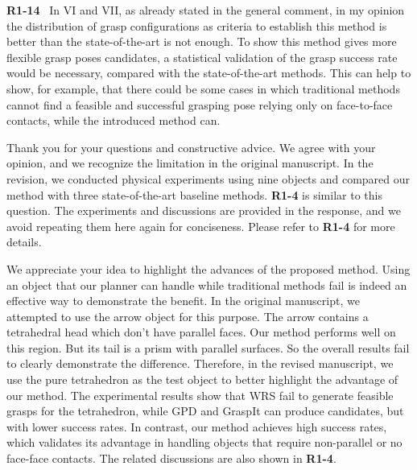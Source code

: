 \documentclass[journal]{IEEEtran}
\begin{document}

\noindent
{\textbf{\color{black}R1-14}\color{gray}~
In VI and VII, as already stated in the general comment, in my opinion the distribution of grasp configurations as criteria to establish this method is better than the state-of-the-art is not enough. To show this method gives more flexible grasp poses candidates, a statistical validation of the grasp success rate would be necessary, compared with the state-of-the-art methods. This can help to show, for example, that there could be some cases in which traditional methods cannot find a feasible and successful grasping pose relying only on face-to-face contacts, while the introduced method can.
}

Thank you for your questions and constructive advice. We agree with your opinion, and we recognize the limitation in the original manuscript. In the revision, we conducted physical experiments using nine objects and compared our method with three state-of-the-art baseline methods. \textbf{R1-4} is similar to this question. The experiments and discussions are provided in the response, and we avoid repeating them here again for conciseness. Please refer to \textbf{R1-4} for more details.

We appreciate your idea to highlight the advances of the proposed method. 
Using an object that our planner can handle while traditional methods fail is indeed an effective way to demonstrate the benefit. In the original manuscript, we attempted to use the arrow object for this purpose. The arrow contains a tetrahedral head which don't have parallel faces. Our method performs well on this region. But its tail is a prism with parallel surfaces. So the overall results fail to clearly demonstrate the difference. Therefore, in the revised manuscript, we use the pure tetrahedron as the test object to better highlight the advantage of our method. The experimental results show that WRS fail to generate feasible grasps for the tetrahedron, while GPD and GraspIt can produce candidates, but with lower success rates. In contrast, our method achieves high success rates, which validates its advantage in handling objects that require non-parallel or no face-face contacts. The related discussions are also shown in \textbf{R1-4}.
\\
\end{document}
